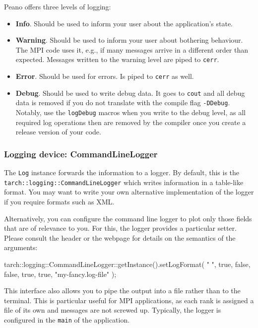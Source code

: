 Peano offers three levels of logging:
\begin{itemize}
  \item {\bf Info}. Should be used to inform your user about the application's
  state.
  \item {\bf Warning}. Should be used to inform your user about bothering
  behaviour.
  The MPI code uses it, e.g., if many messages arrive in a different order than
  expected. Messages written to the warning level are piped to
  \texttt{cerr}.
  \item {\bf Error}. Should be used for errors. Is piped to \texttt{cerr} as
  well.
  \item {\bf Debug}. Should be used to write debug data. It goes to
  \texttt{cout} and all debug data is removed if you do not translate with the compile flag
  \texttt{-DDebug}. Notably, use the \texttt{logDebug} macros when you write to
  the debug level, as all required log operations then are removed by the
  compiler once you create a release version of your code.
\end{itemize}



\subsubsection{Logging device: CommandLineLogger}

The \texttt{Log} instance forwards the information to a logger. By default, this
is the \\ \texttt{tarch::logging::CommandLineLogger} which writes information
in a table-like format. You may want to write your own alternative
implementation of the logger if you require formats such as XML.

Alternatively, you can configure the command line logger to plot only those
fields that are of relevance to you.
For this, the logger provides a particular setter.
Please consult the header or the webpage for details on the semantics of the
arguments:
\begin{code}
tarch::logging::CommandLineLogger::getInstance().setLogFormat(
  " ", true, false, false, true, true, "my-fancy.log-file" );
\end{code} 

\noindent
This interface also allows you to pipe the output into a file rather than to the
terminal.
This is particular useful for MPI applications, as each rank is assigned a file
of its own and messages are not screwed up.
Typically, the logger is configured in the \texttt{main} of the application.

